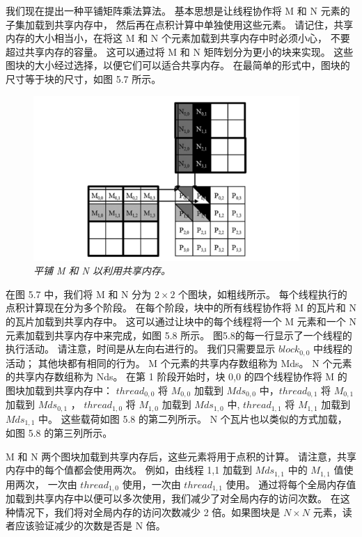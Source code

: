 我们现在提出一种平铺矩阵乘法算法。 基本思想是让线程协作将 M 和 N 元素的子集加载到共享内存中，
然后再在点积计算中单独使用这些元素。 请记住，共享内存的大小相当小，在将这 M 和 N 个元素加载到共享内存中时必须小心，
不要超过共享内存的容量。 这可以通过将 M 和 N 矩阵划分为更小的块来实现。 
这些图块的大小经过选择，以便它们可以适合共享内存。 在最简单的形式中，图块的尺寸等于块的尺寸，如图 5.7 所示。

\begin{figure}[H]
	\centering
	\includegraphics[width=0.9\textwidth]{figs/F5.7.png}
	\caption{\textit{平铺 M 和 N 以利用共享内存。}}
\end{figure}

在图 5.7 中，我们将 M 和 N 分为 $2 \times 2$ 个图块，如粗线所示。 每个线程执行的点积计算现在分为多个阶段。 
在每个阶段，块中的所有线程协作将 M 的瓦片和 N 的瓦片加载到共享内存中。 
这可以通过让块中的每个线程将一个 M 元素和一个 N 元素加载到共享内存中来完成，如图 5.8 所示。 
图5.8的每一行显示了一个线程的执行活动。 请注意，时间是从左向右进行的。 
我们只需要显示 $block_{0,0}$ 中线程的活动； 其他块都有相同的行为。 M 个元素的共享内存数组称为 Mds。 
N 个元素的共享内存数组称为 Nds。 在第 1 阶段开始时，块 0,0 的四个线程协作将 M 的图块加载到共享内存中：
$thread_{0,0}$ 将 $M_{0,0}$ 加载到 $Mds_{0,0}$ 中，$thread_{0,1}$ 将 $M_{0,1}$ 加载到 $Mds_{0,1}$ ，
$thread_{1,0}$ 将 $M_{1,0}$ 加载到 $Mds_{1,0}$ 中, $thread_{1,1}$ 将 $M_{1,1}$ 加载到 $Mds_{1,1}$ 中。 
这些载荷如图 5.8 的第二列所示。 N 个瓦片也以类似的方式加载，如图 5.8 的第三列所示。

M 和 N 两个图块加载到共享内存后，这些元素将用于点积的计算。 请注意，共享内存中的每个值都会使用两次。 
例如，由线程 1,1 加载到 $Mds_{1,1}$ 中的 $M_{1,1}$ 值使用两次，
一次由 $thread_{1,0}$ 使用，一次由 $thread_{1,1}$ 使用。 
通过将每个全局内存值加载到共享内存中以便可以多次使用，我们减少了对全局内存的访问次数。 
在这种情况下，我们将对全局内存的访问次数减少 2 倍。如果图块是 $N \times N$ 元素，读者应该验证减少的次数是否是 N 倍。

